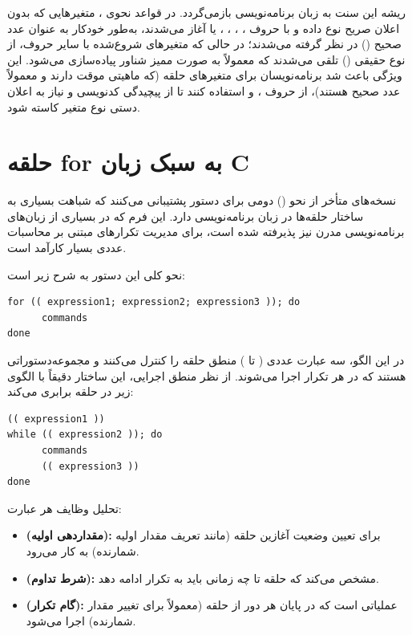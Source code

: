 ریشه این سنت به زبان برنامه‌نویسی  بازمی‌گردد. در قواعد نحوی ، متغیرهایی که بدون اعلان صریح نوع داده و با حروف ، ، ، ،  یا  آغاز می‌شدند، به‌طور خودکار به عنوان عدد صحیح () در نظر گرفته می‌شدند؛ در حالی که متغیرهای شروع‌شده با سایر حروف، از نوع حقیقی () تلقی می‌شدند که معمولاً به صورت ممیز شناور پیاده‌سازی می‌شود. این ویژگی باعث شد برنامه‌نویسان برای متغیرهای حلقه (که ماهیتی موقت دارند و معمولاً عدد صحیح هستند)، از حروف ،  و  استفاده کنند تا از پیچیدگی کدنویسی و نیاز به اعلان دستی نوع متغیر کاسته شود.

\section{حلقه for به سبک زبان C}

نسخه‌های متأخر  از نحو () دومی برای دستور  پشتیبانی می‌کنند که شباهت بسیاری به ساختار حلقه‌ها در زبان برنامه‌نویسی  دارد. این فرم که در بسیاری از زبان‌های برنامه‌نویسی مدرن نیز پذیرفته شده است، برای مدیریت تکرارهای مبتنی بر محاسبات عددی بسیار کارآمد است.

نحو کلی این دستور به شرح زیر است:

\begin{latin}
\begin{lstlisting}
for (( expression1; expression2; expression3 )); do
      commands
done
\end{lstlisting}
\end{latin}

در این الگو، سه عبارت عددی ( تا ) منطق حلقه را کنترل می‌کنند و  مجموعه‌دستوراتی هستند که در هر تکرار اجرا می‌شوند. از نظر منطق اجرایی، این ساختار دقیقاً با الگوی زیر در حلقه  برابری می‌کند:

\begin{latin}
\begin{lstlisting}
(( expression1 ))
while (( expression2 )); do
      commands
      (( expression3 ))
done
\end{lstlisting}
\end{latin}

تحلیل وظایف هر عبارت:

\begin{itemize}
  \item \textbf{ (مقداردهی اولیه):} برای تعیین وضعیت آغازین حلقه (مانند تعریف مقدار اولیه شمارنده) به کار می‌رود.
  \item \textbf{ (شرط تداوم):} مشخص می‌کند که حلقه تا چه زمانی باید به تکرار ادامه دهد.
  \item \textbf{ (گام تکرار):} عملیاتی است که در پایان هر دور از حلقه (معمولاً برای تغییر مقدار شمارنده) اجرا می‌شود.
\end{itemize}

